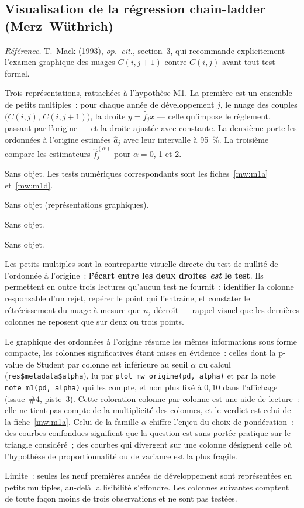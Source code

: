 \documentclass[a4paper,11pt]{article}
\newcommand{\code}[1]{\texttt{\small #1}}
\newcommand{\refl}[1]{{\small\textcolor{maincolor!70!black}{\textit{Référence.} #1}}\par\smallskip}
\newcounter{ficheid}
\newenvironment{fiche}[1]{%
  \stepcounter{ficheid}%
  \phantomsection
  \subsection{#1}%
  \label{fiche:\theficheid}%
}{%
  \end{description}\vspace{0.5em}%
}
\newcommand{\Cadre}{%
  \begin{description}[leftmargin=0pt, style=unboxed, itemsep=3pt, topsep=3pt, parsep=2pt]%
  \item[\textcolor{financeblue}{\textbf{1. Cadre, notations et hypothèses de validité (non testées).}}]}
\newcommand{\Hzero}{\item[\textcolor{financeblue}{\textbf{2. Hypothèse nulle.}}]}
\newcommand{\Stat}{\item[\textcolor{financeblue}{\textbf{3. Statistique de test.}}]}
\newcommand{\Loi}{\item[\textcolor{financeblue}{\textbf{4. Loi sous $H_0$.}}]}
\newcommand{\Pval}{\item[\textcolor{financeblue}{\textbf{5. p-value.}}]}
\newcommand{\Usage}{\item[\textcolor{financeblue}{\textbf{6. Usage et limites.}}]}
\begin{document}
\begin{fiche}{Visualisation de la régression chain-ladder (Merz--Wüthrich)}
\label{sec:graph-mw}
\refl{T.~Mack (1993), \emph{op.\ cit.}, section~3, qui recommande explicitement
l'examen graphique des nuages $C(i,j+1)$ contre $C(i,j)$ avant tout test formel.}
\Cadre
Trois représentations, rattachées à l'hypothèse M1. La première est un ensemble
de petits multiples~: pour chaque année de développement $j$, le nuage des
couples $\big(C(i,j),\,C(i,j+1)\big)$, la droite $y = \hat f_j x$ --- celle
qu'impose le règlement, passant par l'origine --- et la droite ajustée avec
constante. La deuxième porte les ordonnées à l'origine estimées $\hat a_j$ avec
leur intervalle à 95~\%. La troisième compare les estimateurs
$\hat f_j^{(\alpha)}$ pour $\alpha = 0$, 1 et 2.
\Hzero
Sans objet. Les tests numériques correspondants sont les fiches~\ref{mw:m1a}
et~\ref{mw:m1d}.
\Stat
Sans objet (représentations graphiques).
\Loi
Sans objet.
\Pval
Sans objet.
\Usage
Les petits multiples sont la contrepartie visuelle directe du test de nullité de
l'ordonnée à l'origine~: \textbf{l'écart entre les deux droites \emph{est} le
test}. Ils permettent en outre trois lectures qu'aucun test ne fournit~:
identifier la colonne responsable d'un rejet, repérer le point qui l'entraîne, et
constater le rétrécissement du nuage à mesure que $n_j$ décroît --- rappel visuel
que les dernières colonnes ne reposent que sur deux ou trois points.

\medskip
Le graphique des ordonnées à l'origine résume les mêmes informations sous forme
compacte, les colonnes significatives étant mises en évidence~: celles dont la p-value de
Student par colonne est inférieure au seuil $\alpha$ du calcul (\code{res\$metadata\$alpha}),
lu par \code{plot\_mw\_origine(pd, alpha)} et par la note \code{note\_m1(pd, alpha)} qui les
compte, et non plus fixé à $0{,}10$ dans l'affichage (issue~\#4, piste~3). Cette coloration
colonne par colonne est une aide de lecture~: elle ne tient pas compte de la multiplicité des
colonnes, et le verdict est celui de la fiche~\ref{mw:m1a}. Celui de la
famille $\alpha$ chiffre l'enjeu du choix de pondération~: des courbes
confondues signifient que la question est sans portée pratique sur le triangle
considéré~; des courbes qui divergent sur une colonne désignent celle où
l'hypothèse de proportionnalité ou de variance est la plus fragile.

\medskip
Limite~: seules les neuf premières années de développement sont représentées en
petits multiples, au-delà la lisibilité s'effondre. Les colonnes suivantes
comptent de toute façon moins de trois observations et ne sont pas testées.
\end{fiche}
\end{document}
